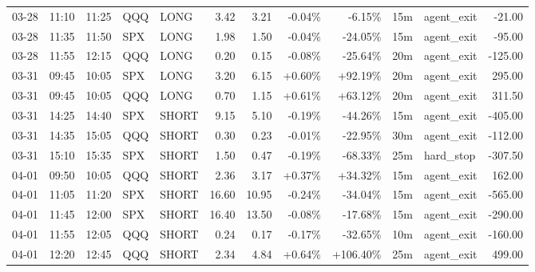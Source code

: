 \documentclass[11pt,a4paper]{article}
\begin{document}
\begin{center}
\begin{longtable}{>{\color{txtmain}}l l l l l r r r r r >{\color{txtmain}}l r}
03-28 & 11:10 & 11:25 & QQQ & LONG & 3.42 & 3.21 & \textcolor{lossred}{-0.04\%} & \textcolor{lossred}{-6.15\%} & 15m & agent\_exit & \textcolor{lossred}{-21.00} \\
03-28 & 11:35 & 11:50 & SPX & LONG & 1.98 & 1.50 & \textcolor{lossred}{-0.04\%} & \textcolor{lossred}{-24.05\%} & 15m & agent\_exit & \textcolor{lossred}{-95.00} \\
03-28 & 11:55 & 12:15 & QQQ & LONG & 0.20 & 0.15 & \textcolor{lossred}{-0.08\%} & \textcolor{lossred}{-25.64\%} & 20m & agent\_exit & \textcolor{lossred}{-125.00} \\
03-31 & 09:45 & 10:05 & SPX & LONG & 3.20 & 6.15 & \textcolor{wingreen}{+0.60\%} & \textcolor{wingreen}{+92.19\%} & 20m & agent\_exit & \textcolor{wingreen}{295.00} \\
03-31 & 09:45 & 10:05 & QQQ & LONG & 0.70 & 1.15 & \textcolor{wingreen}{+0.61\%} & \textcolor{wingreen}{+63.12\%} & 20m & agent\_exit & \textcolor{wingreen}{311.50} \\
03-31 & 14:25 & 14:40 & SPX & SHORT & 9.15 & 5.10 & \textcolor{lossred}{-0.19\%} & \textcolor{lossred}{-44.26\%} & 15m & agent\_exit & \textcolor{lossred}{-405.00} \\
03-31 & 14:35 & 15:05 & QQQ & SHORT & 0.30 & 0.23 & \textcolor{lossred}{-0.01\%} & \textcolor{lossred}{-22.95\%} & 30m & agent\_exit & \textcolor{lossred}{-112.00} \\
03-31 & 15:10 & 15:35 & SPX & SHORT & 1.50 & 0.47 & \textcolor{lossred}{-0.19\%} & \textcolor{lossred}{-68.33\%} & 25m & hard\_stop & \textcolor{lossred}{-307.50} \\
04-01 & 09:50 & 10:05 & QQQ & SHORT & 2.36 & 3.17 & \textcolor{wingreen}{+0.37\%} & \textcolor{wingreen}{+34.32\%} & 15m & agent\_exit & \textcolor{wingreen}{162.00} \\
04-01 & 11:05 & 11:20 & SPX & SHORT & 16.60 & 10.95 & \textcolor{lossred}{-0.24\%} & \textcolor{lossred}{-34.04\%} & 15m & agent\_exit & \textcolor{lossred}{-565.00} \\
04-01 & 11:45 & 12:00 & SPX & SHORT & 16.40 & 13.50 & \textcolor{lossred}{-0.08\%} & \textcolor{lossred}{-17.68\%} & 15m & agent\_exit & \textcolor{lossred}{-290.00} \\
04-01 & 11:55 & 12:05 & QQQ & SHORT & 0.24 & 0.17 & \textcolor{lossred}{-0.17\%} & \textcolor{lossred}{-32.65\%} & 10m & agent\_exit & \textcolor{lossred}{-160.00} \\
04-01 & 12:20 & 12:45 & QQQ & SHORT & 2.34 & 4.84 & \textcolor{wingreen}{+0.64\%} & \textcolor{wingreen}{+106.40\%} & 25m & agent\_exit & \textcolor{wingreen}{499.00} \\

\end{longtable}
\end{center}
\end{document}
